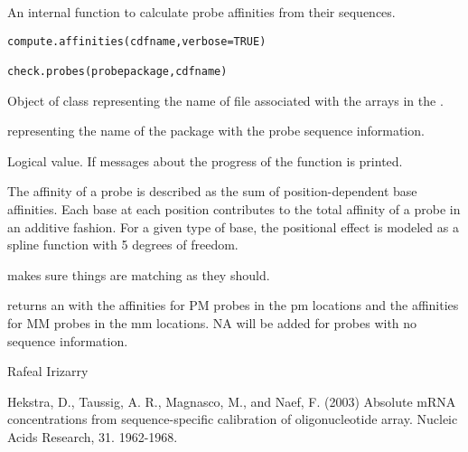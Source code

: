 \begin{Description}\relax
An internal function to calculate probe affinities from their
sequences.
\end{Description}
\begin{Usage}
\begin{verbatim}
compute.affinities(cdfname,verbose=TRUE)

check.probes(probepackage,cdfname)
\end{verbatim}
\end{Usage}
\begin{Arguments}
\begin{ldescription}
\item[\code{cdfname}] Object of class  representing the name of
 file associated with the arrays in the .
\item[\code{probepackage}]  representing the name of the
package with the probe sequence information.
\item[\code{verbose}] Logical value. If  messages about the progress of
the function is printed.
\end{ldescription}
\end{Arguments}
\begin{Details}\relax
The affinity of a probe is described as the sum of position-dependent base affinities.
Each base at each position contributes to the total affinity of a probe
in an additive fashion. For a given type of base, the positional effect
is modeled as a spline function with 5 degrees of freedom.

 makes sure things are matching as they should.
\end{Details}
\begin{Value}
 returns an  with the
affinities for PM probes in the pm locations and the affinities for MM
probes in the mm locations. NA  will be added for probes with no
sequence information.
\end{Value}
\begin{Author}\relax
Rafeal Irizarry
\end{Author}
\begin{References}\relax
Hekstra, D., Taussig, A. R., Magnasco, M., and Naef, F. (2003) Absolute mRNA concentrations from sequence-specific calibration of oligonucleotide array. Nucleic Acids Research, 31. 1962-1968.
\end{References}
\begin{SeeAlso}\relax
{}
\end{SeeAlso}


